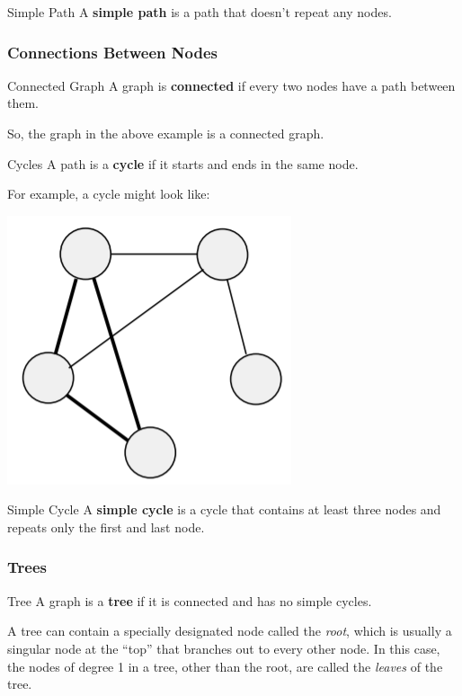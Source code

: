 \documentclass[letterpaper]{article}
\begin{document}
\begin{definition}{Simple Path}{}
    A \textbf{simple path} is a path that doesn't repeat any nodes. 
\end{definition}

\subsubsection{Connections Between Nodes}
\begin{definition}{Connected Graph}{}
    A graph is \textbf{connected} if every two nodes have a path between them. 
\end{definition}
So, the graph in the above example is a connected graph. 

\begin{definition}{Cycles}{}
    A path is a \textbf{cycle} if it starts and ends in the same node.
\end{definition}
For example, a cycle might look like: 
\begin{center}
    \includegraphics[scale=0.5]{../assets/cycle.png}
\end{center}

\begin{definition}{Simple Cycle}{}
    A \textbf{simple cycle} is a cycle that contains at least three nodes and repeats only the first and last node.
\end{definition}

\subsubsection{Trees}
\begin{definition}{Tree}{}
    A graph is a \textbf{tree} if it is connected and has no simple cycles. 
\end{definition}
A tree can contain a specially designated node called the \emph{root}, which is usually a singular node at the ``top'' that branches out to every other node. In this case, the nodes of degree 1 in a tree, other than the root, are called the \emph{leaves} of the tree. 
\end{document}
